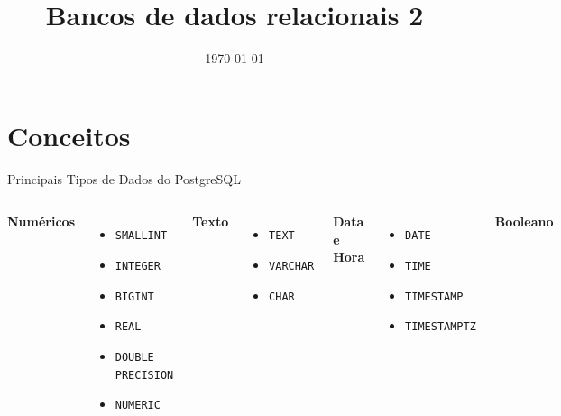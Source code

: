 \documentclass{beamer}
\title{Bancos de dados relacionais 2}
\date{\today}
\begin{document}
    


\sumario

\section{Conceitos}

\begin{frame}[fragile]{Principais Tipos de Dados do PostgreSQL}

\scriptsize

\begin{columns}[t]


\textbf{Numéricos}

\begin{itemize}
    \item \texttt{SMALLINT}
    \item \texttt{INTEGER}
    \item \texttt{BIGINT}
    \item \texttt{REAL}
    \item \texttt{DOUBLE PRECISION}
    \item \texttt{NUMERIC}
\end{itemize}

\vspace{0.2cm}

\textbf{Texto}

\begin{itemize}
    \item \texttt{TEXT}
    \item \texttt{VARCHAR}
    \item \texttt{CHAR}
\end{itemize}


\textbf{Data e Hora}

\begin{itemize}
    \item \texttt{DATE}
    \item \texttt{TIME}
    \item \texttt{TIMESTAMP}
    \item \texttt{TIMESTAMPTZ}
\end{itemize}

\vspace{0.2cm}

\textbf{Booleano}


\end{columns}
\end{frame}
\end{document}
